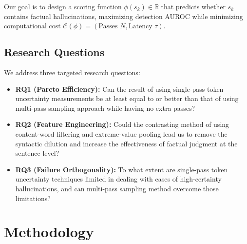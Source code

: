 \documentclass[conference]{IEEEtran}
\begin{document}
Our goal is to design a scoring function $\phi(s_k) \in \mathbb{R}$ that predicts whether $s_k$ contains factual hallucinations, maximizing detection AUROC while minimizing computational cost $\mathcal{C}(\phi) = (\text{Passes } N, \text{Latency } \tau)$.

\subsection{Research Questions}
We address three targeted research questions:
\begin{itemize}
    \item \textbf{RQ1 (Pareto Efficiency):} Can the result of using single-pass token uncertainty measurements be at least equal to or better than that of using multi-pass sampling approach while having no extra passes?
    \item \textbf{RQ2 (Feature Engineering):} Could the contrasting method of using content-word filtering and extreme-value pooling lead us to remove the syntactic dilution and increase the effectiveness of factual judgment at the sentence level?
    \item \textbf{RQ3 (Failure Orthogonality):} To what extent are single-pass token uncertainty techniques limited in dealing with cases of high-certainty hallucinations, and can multi-pass sampling method overcome those limitations?
\end{itemize}

\section{Methodology}
\end{document}
